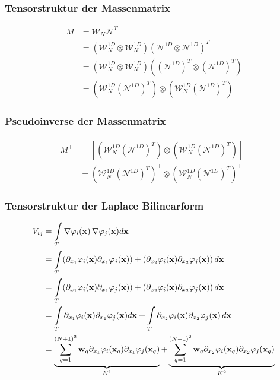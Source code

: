 \begin{frame}
\frametitle{Tensorstruktur der Massenmatrix}
\begin{framed}
\begin{equation*}
\begin{aligned}
M &= \mathcal{W}_N \mathcal{N}^T \\
&= (\mathcal{W}_N^{1D} \otimes \mathcal{W}_N^{1D})(\mathcal{N}^{1D} \otimes \mathcal{N}^{1D})^T \\
&= (\mathcal{W}_N^{1D} \otimes \mathcal{W}_N^{1D})((\mathcal{N}^{1D})^T \otimes (\mathcal{N}^{1D})^T) \\
&= (\mathcal{W}_N^{1D} (\mathcal{N}^{1D})^T) \otimes  (\mathcal{W}_N^{1D} (\mathcal{N}^{1D})^T) 
\end{aligned}
\end{equation*}
\end{framed}
\end{frame}

\begin{frame}
\frametitle{Pseudoinverse der Massenmatrix}
\begin{equation*}
\begin{aligned}
M^+ & = [(\mathcal{W}_N^{1D} (\mathcal{N}^{1D})^T) \otimes  (\mathcal{W}_N^{1D} (\mathcal{N}^{1D})^T)]^+ \\ &= (\mathcal{W}_N^{1D} (\mathcal{N}^{1D})^T)^+ \otimes  (\mathcal{W}_N^{1D} (\mathcal{N}^{1D})^T)^+ 
\end{aligned}
\end{equation*}
\end{frame}





\begin{frame}
\frametitle{Tensorstruktur der Laplace Bilinearform}
\begin{equation*}
\begin{aligned}
V_{ij} &= \int\limits_{T} \nabla \varphi_i(\bold{x}) \, \nabla \varphi_j(\bold{x})  d \bold{x} \\ 
&= \int\limits_{T}( \partial_{x_1}  \varphi_i(\bold{x})  \partial_{x_1} \varphi_j(\bold{x})) + ( \partial_{x_2} \varphi_i(\bold{x})  \partial_{x_2} \varphi_j(\bold{x})) \, d\bold{x} \\
&= \int\limits_{T}( \partial_{x_1}  \varphi_i(\bold{x})  \partial_{x_1} \varphi_j(\bold{x})) + ( \partial_{x_2} \varphi_i(\bold{x})  \partial_{x_2} \varphi_j(\bold{x})) \, d\bold{x} \\ &= \int\limits_{T} \partial_{x_1}  \varphi_i(\bold{x})  \partial_{x_1} \varphi_j(\bold{x}) d\bold{x} + \int\limits_{T}  \partial_{x_2} \varphi_i(\bold{x})  \partial_{x_2} \varphi_j(\bold{x}) \, d\bold{x} \\
&= \underbrace{\sum\limits_{q=1}^{(N+1)^2} \bold{w}_q \partial_{x_1}  \varphi_i(\bold{x}_q)  \partial_{x_1} \varphi_j (\bold{x}_q)}_{K^1} + \underbrace{\sum\limits_{q=1}^{(N+1)^2} \bold{w}_q  \partial_{x_2} \varphi_i(\bold{x}_q)  \partial_{x_2} \varphi_j(\bold{x}_q)}_{K^2} \, 
\end{aligned}
\end{equation*}
\end{frame}

